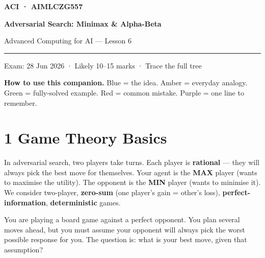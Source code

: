 \documentclass[a4paper,11pt]{article}
\begin{document}
\begin{tcolorbox}[enhanced,colback=NavyBanner,colframe=NavyBanner,arc=0pt,
  boxrule=0pt,left=10mm,right=10mm,top=8mm,bottom=8mm]
  {\small\bfseries\sffamily\color{white}\MakeUppercase{ACI · AIMLCZG557}}\par\vspace{4pt}
  {\LARGE\bfseries\sffamily\color{white}Adversarial Search: Minimax \& Alpha-Beta}\par\vspace{4pt}
  {\normalsize\color{white!80!NavyBanner}Advanced Computing for AI — Lesson 6}\par
  \textcolor{white!40!NavyBanner}{\rule{\linewidth}{0.4pt}}\par\vspace{2pt}
  {\small\color{white!70!NavyBanner}Exam: 28 Jun 2026 · Likely 10--15 marks · Trace the full tree}
\end{tcolorbox}

\vspace{4pt}
{\small\textbf{How to use this companion.} \textcolor{IntFrame}{Blue} = the idea. \textcolor{EveFrame}{Amber} = everyday analogy. \textcolor{WrkFrame}{Green} = fully-solved example. \textcolor{WatFrame}{Red} = common mistake. \textcolor{KeyFrame}{Purple} = one line to remember.}

\vspace{8pt}

\section{1 \quad Game Theory Basics}

In adversarial search, two players take turns. Each player is \textbf{rational} — they will always pick the best move for themselves. Your agent is the \textbf{MAX} player (wants to maximise the utility). The opponent is the \textbf{MIN} player (wants to minimise it). We consider two-player, \textbf{zero-sum} (one player's gain = other's loss), \textbf{perfect-information}, \textbf{deterministic} games.

\begin{intuition}
You are playing a board game against a perfect opponent. You plan several moves ahead, but you must assume your opponent will always pick the worst possible response for you. The question is: what is your best move, given that assumption?
\end{intuition}
\end{document}
